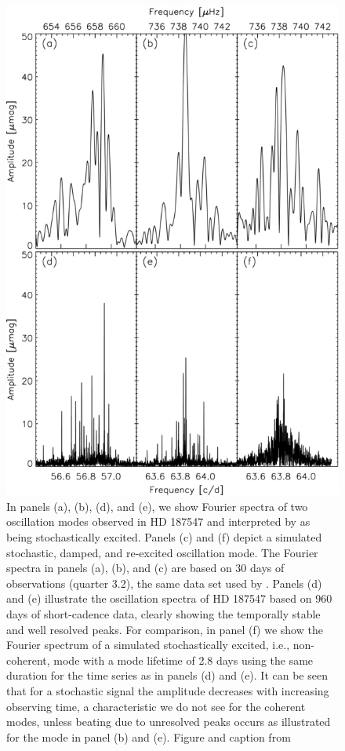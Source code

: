 \begin{figure}[htbp]
    \centering
    \includegraphics[width=1\textwidth]{superstar2.jpg}
    \caption{In panels (a), (b), (d), and (e), we show Fourier spectra of two
    	oscillation modes observed in HD 187547 and interpreted by \citet{antoci2011excitation}
    	as being stochastically excited. Panels (c) and (f) depict a simulated stochastic,
    	damped, and re-excited oscillation mode. The Fourier spectra in panels (a), (b),
    	and (c) are based on 30 days of observations (quarter 3.2), the same data set
    	used by \citet{antoci2011solar}. Panels (d) and (e) illustrate the oscillation spectra
    	of HD 187547 based on 960 days of short-cadence data, clearly showing the
    	temporally stable and well resolved peaks. For comparison, in panel (f) we show
    	the Fourier spectrum of a simulated stochastically excited, i.e., non-coherent,
    	mode with a mode lifetime of 2.8 days using the same duration for the time
    	series as in panels (d) and (e). It can be seen that for a stochastic signal the
    	amplitude decreases with increasing observing time, a characteristic we do not
    	see for the coherent modes, unless beating due to unresolved peaks occurs as
    	illustrated for the mode in panel (b) and (e). Figure and caption from \citet{antoci2014role}}
    \label{ss2}
\end{figure}

